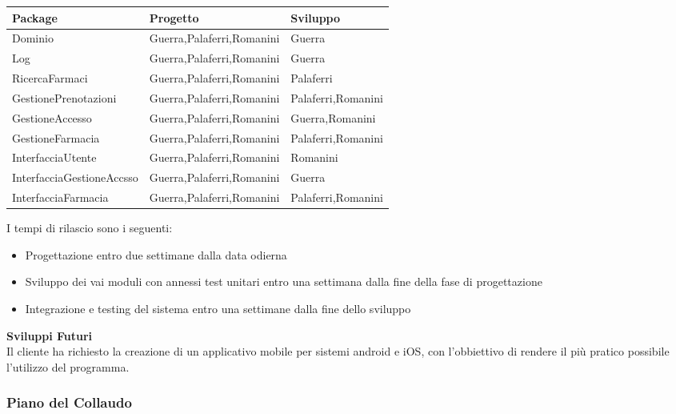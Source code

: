 \begin{tabular} {|P{5cm}|P{5cm}|P{5cm}|} %
    \hline
    \textbf{Package} & \textbf{Progetto} & \textbf{Sviluppo} \\
    \hline
    Dominio  &  Guerra,Palaferri,Romanini  &  Guerra\\
    \hline
    Log  &  Guerra,Palaferri,Romanini & Guerra\\
    \hline
    RicercaFarmaci  &  Guerra,Palaferri,Romanini &  Palaferri \\
    \hline
    GestionePrenotazioni  & Guerra,Palaferri,Romanini & Palaferri,Romanini \\
    \hline
    GestioneAccesso  & Guerra,Palaferri,Romanini & Guerra,Romanini \\
    \hline
    GestioneFarmacia  & Guerra,Palaferri,Romanini & Palaferri,Romanini \\
    \hline
    InterfacciaUtente  & Guerra,Palaferri,Romanini & Romanini \\
    \hline
    InterfacciaGestioneAccsso  & Guerra,Palaferri,Romanini & Guerra\\
    \hline
    InterfacciaFarmacia  & Guerra,Palaferri,Romanini & Palaferri,Romanini \\
    \hline
\end{tabular}
\hfill \break

I tempi di rilascio sono i seguenti:
\begin{itemize}
    \item Progettazione entro due settimane dalla data odierna
    \item Sviluppo dei vai moduli con annessi test unitari entro una settimana dalla fine della fase di progettazione
    \item Integrazione e testing del sistema entro una settimane dalla fine dello sviluppo
\end{itemize}
\hfill \break

\textbf{Sviluppi Futuri}
\\

Il cliente ha richiesto la creazione di un applicativo mobile per sistemi
android e iOS, con l'obbiettivo di rendere il più pratico possibile l'utilizzo
del programma.

\newpage
\subsubsection{Piano del Collaudo}

